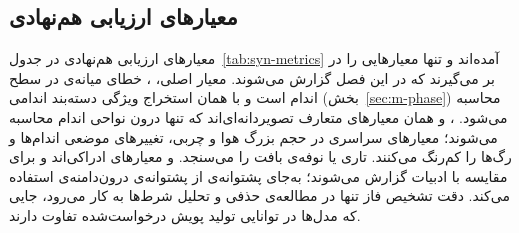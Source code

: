 


\subsection{معیارهای ارزیابی هم‌نهادی}
\label{sec:m-eval}

معیارهای ارزیابی هم‌نهادی در جدول~\ref{tab:syn-metrics} آمده‌اند و تنها معیارهایی را در بر می‌گیرند که در این فصل گزارش می‌شوند. معیار اصلی، ، خطای میانه‌ی  در سطح اندام است و با همان استخراج ویژگی دسته‌بند اندامی (بخش~\ref{sec:m-phase}) محاسبه می‌شود. ،  و  همان معیارهای متعارف تصویردانه‌ای‌اند که تنها درون نواحی اندام محاسبه می‌شوند؛ معیارهای سراسری در حجم بزرگ هوا و چربی، تغییرهای موضعی اندام‌ها و رگ‌ها را کم‌رنگ می‌کنند.  تاری یا نوفه‌ی بافت را می‌سنجد.  و  معیارهای ادراکی‌اند و برای مقایسه با ادبیات گزارش می‌شوند؛  به‌جای پشتوانه‌ی  از پشتوانه‌ی درون‌دامنه‌ی  استفاده می‌کند. دقت تشخیص فاز تنها در مطالعه‌ی حذفی و تحلیل شرط‌ها به کار می‌رود، جایی که مدل‌ها در توانایی تولید پویش درخواست‌شده تفاوت دارند.

